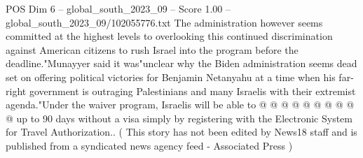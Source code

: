\begin{textsample}{POS Dim 6 – global\_south\_2023\_09 – Score 1.00 – global\_south\_2023\_09/102055776.txt}
The administration however seems committed at the highest levels to overlooking this continued discrimination against American citizens to rush Israel into the program before the deadline."Munayyer said it was"unclear why the Biden administration seems dead set on offering political victories for Benjamin Netanyahu at a time when his far-right government is outraging Palestinians and many Israelis with their extremist agenda."Under the waiver program, Israelis will be able to @ @ @ @ @ @ @ @ @ @ up to 90 days without a visa simply by registering with the Electronic System for Travel Authorization.. ( This story has not been edited by News18 staff and is published from a syndicated news agency feed - Associated Press )

\end{textsample}

